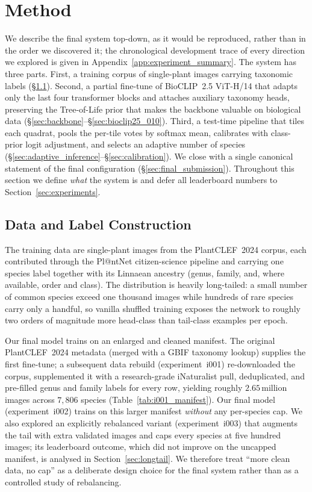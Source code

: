 \section{Method}
\label{sec:method}

We describe the final system top-down, as it would be reproduced, rather than in the order
we discovered it; the chronological development trace of every direction we explored is given
in Appendix~\ref{app:experiment_summary}. The system has three parts. First, a training corpus
of single-plant images carrying taxonomic labels (\S\ref{sec:cap_extra}). Second, a partial
fine-tune of BioCLIP~2.5 ViT-H/14 that adapts only the last four transformer blocks and
attaches auxiliary taxonomy heads, preserving the Tree-of-Life prior that makes the backbone
valuable on biological data (\S\ref{sec:backbone}--\S\ref{sec:bioclip25_010}). Third, a
test-time pipeline that tiles each quadrat, pools the per-tile votes by softmax mean,
calibrates with class-prior logit adjustment, and selects an adaptive number of species
(\S\ref{sec:adaptive_inference}--\S\ref{sec:calibration}). We close with a single canonical
statement of the final configuration (\S\ref{sec:final_submission}). Throughout this
section we define \emph{what} the system is and defer all leaderboard numbers to
Section~\ref{sec:experiments}.

\subsection{Data and Label Construction}
\label{sec:cap_extra}

The training data are single-plant images from the PlantCLEF~2024 corpus, each contributed
through the Pl@ntNet citizen-science pipeline and carrying one species label together with its
Linnaean ancestry (genus, family, and, where available, order and class). The distribution is
heavily long-tailed: a small number of common species exceed one thousand images while hundreds
of rare species carry only a handful, so vanilla shuffled training exposes the network to
roughly two orders of magnitude more head-class than tail-class examples per epoch.

Our final model trains on an enlarged and cleaned manifest. The original PlantCLEF~2024 metadata
(merged with a GBIF taxonomy lookup) supplies the first fine-tune; a subsequent data rebuild
(experiment~i001) re-downloaded the corpus, supplemented it with a research-grade iNaturalist
pull, deduplicated, and pre-filled genus and family labels for every row, yielding roughly
$2.65$\,million images across $7{,}806$ species (Table~\ref{tab:i001_manifest}). Our final
model (experiment~i002) trains on this larger manifest \emph{without} any per-species cap. We
also explored an explicitly rebalanced variant (experiment~i003) that augments the tail with
extra validated images and caps every species at five hundred images; its leaderboard outcome,
which did not improve on the uncapped manifest, is analysed in Section~\ref{sec:longtail}. We
therefore treat ``more clean data, no cap'' as a deliberate design choice for the final system
rather than as a controlled study of rebalancing.

